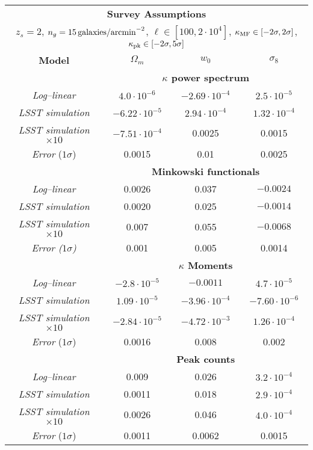 \begin{table}
\begin{center}
\begin{tabular}{c|ccc} 
\multicolumn{4}{c}{\textbf{Survey Assumptions}} \\
\multicolumn{4}{c}{$z_s=2$, $n_g=15\,{\rm galaxies/arcmin}^{-2}$, $\ell\in[100,2\cdot10^4]$, $\kappa_{\rm MF}\in[-2\sigma,2\sigma]$, $\kappa_{\rm pk}\in[-2\sigma,5\sigma]$} \\ \hline \hline

\textbf{Model} & $\Omega_m$ & $w_0$ & $\sigma_8$  \\ \hline \hline 
&\multicolumn{3}{c}{\textbf{$\kappa$ power spectrum}} \\ 
\textit{Log--linear} & $4.0\cdot 10^{-6}$  & $-2.69\cdot 10^{-4}$ & $2.5\cdot 10^{-5}$ \\
\textit{LSST simulation} &  $-6.22\cdot10^{-5}$ &  $2.94\cdot10^{-4}$ &  $1.32\cdot10^{-4}$ \\
\textit{LSST simulation} $\times 10$ & $-7.51\cdot10^{-4}$ &  0.0025 &  0.0015 \\ 
\textit{Error} ($1\sigma$) & 0.0015 & 0.01 & 0.0025 \\ \hline \hline

&\multicolumn{3}{c}{\textbf{Minkowski functionals}} \\ 
\textit{Log--linear} & 0.0026 &0.037 & $-0.0024$ \\
\textit{LSST simulation} & 0.0020 &  0.025 & $-0.0014$ \\
\textit{LSST simulation} $\times 10$ & 0.007 & 0.055 & $-0.0068$ \\ 
\textit{Error ($1\sigma$)} & 0.001 &0.005  &0.0014 \\ \hline

&\multicolumn{3}{c}{\textbf{$\kappa$ Moments}} \\ 
\textit{Log--linear} & $-2.8\cdot 10^{-5}$ & $-0.0011$  & $4.7\cdot 10^{-5}$ \\
\textit{LSST simulation} & $1.09\cdot10^{-5}$ & $-3.96\cdot10^{-4}$ & $-7.60\cdot10^{-6}$ \\
\textit{LSST simulation} $\times 10$ & $-2.84\cdot10^{-5}$ & $-4.72\cdot10^{-3}$ &  $1.26\cdot10^{-4}$ \\ 
\textit{Error} ($1\sigma$) & 0.0016 &0.008  & 0.002  \\ \hline \hline

&\multicolumn{3}{c}{\textbf{Peak counts}} \\ 
\textit{Log--linear} & 0.009 & 0.026 & $3.2\cdot 10^{-4}$ \\
\textit{LSST simulation} & 0.0011 &  0.018 &  $2.9\cdot10^{-4}$ \\
\textit{LSST simulation} $\times 10$ & 0.0026 & 0.046 & $4.0\cdot10^{-4}$ \\ 
\textit{Error} ($1\sigma$) & 0.0011  & 0.0062  & 0.0015 \\ \hline \hline


\end{tabular}
\end{center}
\end{table}

